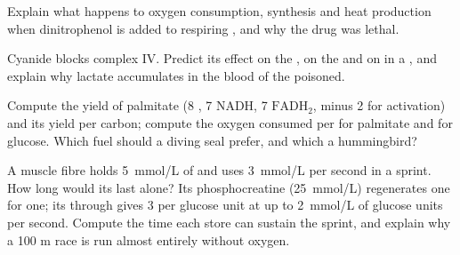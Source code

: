 \begin{exercise}[$\star\star$]\label{exo:b1:respiration-fermentation:8}
Explain what happens to oxygen consumption,  synthesis and heat
production when dinitrophenol is added to respiring , and
why the drug was lethal.
\end{exercise}

\begin{exercise}[$\star\star$]\label{exo:b1:respiration-fermentation:9}
Cyanide blocks complex IV. Predict its effect on the , on the  and on  in a , and explain why
lactate accumulates in the blood of the poisoned.
\end{exercise}

\begin{exercise}[$\star\star\star$]\label{exo:b1:respiration-fermentation:10}
Compute the  yield of palmitate (8 , 7 NADH, 7
$\mathrm{FADH_2}$, minus 2  for activation) and its yield per carbon;
compute the oxygen consumed per  for palmitate and for glucose.
Which fuel should a diving seal prefer, and which a hummingbird?
\end{exercise}

\begin{exercise}[$\star\star\star$]\label{exo:b1:respiration-fermentation:11}
A muscle fibre holds \qty{5}{mmol/L} of  and uses
\qty{3}{mmol/L} per second in a sprint. How long would its  last
alone? Its phosphocreatine (\qty{25}{mmol/L}) regenerates  one for
one; its  through  gives 3  per glucose unit at
up to \qty{2}{mmol/L} of glucose units per second. Compute the time
each store can sustain the sprint, and explain why a 100 m race is run
almost entirely without oxygen.
\end{exercise}

